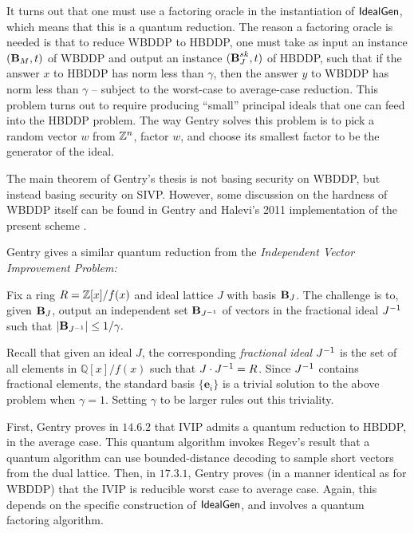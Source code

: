         It turns out that one must use a factoring oracle in the instantiation of ${\sf IdealGen}$, which means that this is a quantum reduction. The reason a factoring oracle is needed is that to reduce WBDDP to HBDDP, one must take as input an instance $(\textbf{B}_M, t)$ of WBDDP and output an instance $(\textbf{B}_J^{sk}, t)$ of HBDDP, such that if the answer $x$ to HBDDP has norm less than $\gamma$, then the answer $y$ to WBDDP has norm less than $\gamma$ -- subject to the worst-case to average-case reduction. This problem turns out to require producing ``small'' principal ideals that one can feed into the HBDDP problem. The way Gentry solves this problem is to pick a random vector $w$ from $\mathbb{Z}^n$, factor $w$, and choose its smallest factor to be the generator of the ideal.

        The main theorem of Gentry's thesis is not basing security on WBDDP, but instead basing security on SIVP. However, some discussion on the hardness of WBDDP itself can be found in Gentry and Halevi's 2011 implementation of the present scheme \cite{gh11implementing}.

        Gentry gives a similar quantum reduction from the \emph{Independent Vector Improvement Problem:}
        \begin{definition} 
            Fix a ring $R = \mathbb{Z}[x] / f(x)$ and ideal lattice $J$ with basis $\textbf{B}_J$. The challenge is to, given $\textbf{B}_J$, output an independent set $\textbf{B}_{J ^{-1}}$ of vectors in the fractional ideal $J ^{-1}$ such that $|\textbf{B}_{J ^{-1}}| \leq 1/\gamma.$
        \end{definition}

        Recall that given an ideal $J$, the corresponding \emph{fractional ideal} $J ^{-1}$ is the set of all elements in $\mathbb{Q}[x] / f(x)$ such that $J \cdot J^{-1} = R$. Since $J ^{-1}$ contains fractional elements, the standard basis $\{\mathbf{e}_i\}$ is a trivial solution to the above problem when $\gamma = 1$. Setting $\gamma$ to be larger rules out this triviality.

        First, Gentry proves in $14.6.2$ that IVIP admits a quantum reduction to HBDDP, in the average case. This quantum algorithm invokes Regev's result that a quantum algorithm can use bounded-distance decoding to sample short vectors from the dual lattice. Then, in $17.3.1$, Gentry proves (in a manner identical as for WBDDP) that the IVIP is reducible worst case to average case. Again, this depends on the specific construction of ${\sf IdealGen}$, and involves a quantum factoring algorithm.


